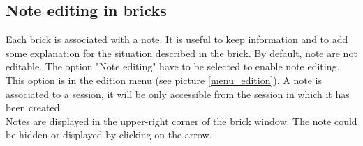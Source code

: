 \subsection{Note editing in bricks}
Each brick is associated with a note. It is useful to keep information and to add some explanation for the situation described in the brick. By default, note are not editable. The option "Note editing" have to be selected to enable note editing. This option is in the edition menu (see picture \ref{menu_edition}). A note is associated to a session, it will be only accessible from the session in which it has been created.\\

Notes are displayed in the upper-right corner of the brick window. The note could be hidden or displayed by clicking on the arrow.\\

